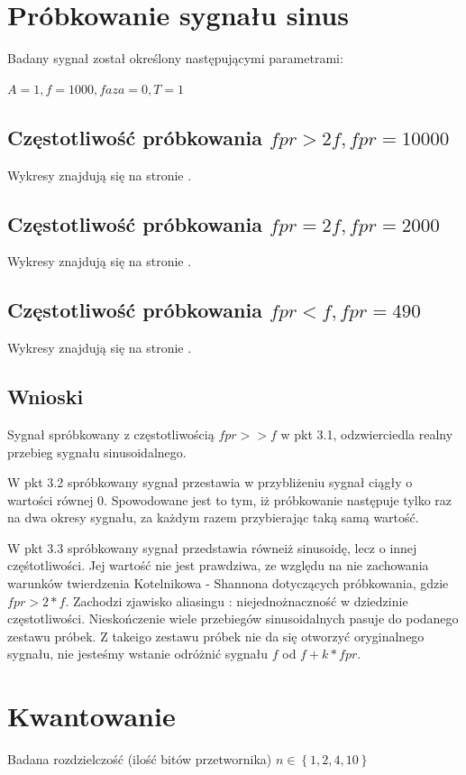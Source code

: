 \documentclass[wide,a4paper,titlepage,12pt]{mwart}
\begin{document}
  
  \section{Próbkowanie sygnału sinus}
		Badany sygnał został określony następującymi parametrami:
		
		$A=1, f=1000, faza=0, T=1$
				
		\subsection{Częstotliwość próbkowania $fpr > 2f, fpr=10000$}
			Wykresy znajdują się na stronie \pageref{prob1}.
			
		\subsection{Częstotliwość próbkowania $fpr=2f, fpr=2000$}
			Wykresy znajdują się na stronie \pageref{prob2}.
				
		\subsection{Częstotliwość próbkowania $fpr < f, fpr=490$}
			Wykresy znajdują się na stronie \pageref{prob3}.
		
		\subsection{Wnioski}
		Sygnał spróbkowany z częstotliwością $fpr>>f$ w pkt 3.1, odzwierciedla realny przebieg sygnału sinusoidalnego.
		
		W pkt 3.2 spróbkowany sygnał przestawia w przybliżeniu sygnał ciągły o wartości równej 0. Spowodowane jest to tym, iż próbkowanie następuje tylko raz na dwa okresy sygnału, za każdym razem przybierając taką samą wartość.
		
		W pkt 3.3 spróbkowany sygnał przedstawia równeiż sinusoidę, lecz o innej częśtotliwości. Jej wartość nie jest prawdziwa, ze względu na nie zachowania warunków twierdzenia Kotelnikowa - Shannona dotyczących próbkowania, gdzie $fpr > 2*f$. Zachodzi zjawisko aliasingu : niejednożnaczność w dziedzinie częstotliwości. Nieskończenie wiele przebiegów sinusoidalnych pasuje do podanego zestawu próbek. Z takeigo zestawu próbek nie da się otworzyć oryginalnego sygnału, nie jesteśmy wstanie odróżnić sygnału $f$ od $f + k*fpr$.

  \section{Kwantowanie}
		Badana rozdzielczość (ilość bitów przetwornika) $n \in \left \{1, 2, 4, 10\right \}$
\end{document}
